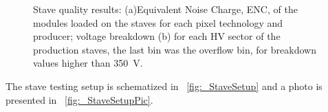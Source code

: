 \begin{figure}
	\centering
	\hfill
	\hfill
	\caption{Stave quality results:  (a)Equivalent Noise Charge, ENC, of the modules loaded on the staves for each pixel technology and producer; voltage breakdown (b) for each HV sector of the production staves, the last bin was the overflow bin, for breakdown values higher than 350~V.}
	\label{fig:_StaveRes}
\end{figure}

The stave testing setup is schematized in ~\ref{fig:_StaveSetup} and a photo is presented in ~\ref{fig:_StaveSetupPic}.

